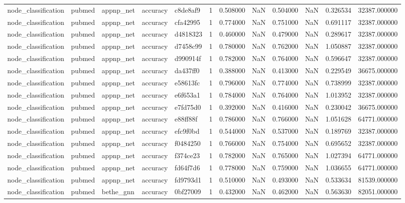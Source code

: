 \begin{tabular}{lllllrrrrrrr}
node_classification & pubmed & appnp_net & accuracy & c8de8af9 & 1 & 0.508000 & NaN & 0.504000 & NaN & 0.326534 & 32387.000000 \\
node_classification & pubmed & appnp_net & accuracy & cfa42995 & 1 & 0.774000 & NaN & 0.751000 & NaN & 0.691117 & 32387.000000 \\
node_classification & pubmed & appnp_net & accuracy & d4818323 & 1 & 0.460000 & NaN & 0.479000 & NaN & 0.289617 & 32387.000000 \\
node_classification & pubmed & appnp_net & accuracy & d7458c99 & 1 & 0.780000 & NaN & 0.762000 & NaN & 1.050887 & 32387.000000 \\
node_classification & pubmed & appnp_net & accuracy & d990914f & 1 & 0.782000 & NaN & 0.764000 & NaN & 0.596647 & 32387.000000 \\
node_classification & pubmed & appnp_net & accuracy & da437ff0 & 1 & 0.388000 & NaN & 0.413000 & NaN & 0.229549 & 36675.000000 \\
node_classification & pubmed & appnp_net & accuracy & e58613fc & 1 & 0.796000 & NaN & 0.774000 & NaN & 0.738999 & 32387.000000 \\
node_classification & pubmed & appnp_net & accuracy & e6f653a1 & 1 & 0.784000 & NaN & 0.764000 & NaN & 1.013952 & 32387.000000 \\
node_classification & pubmed & appnp_net & accuracy & e7fd75d0 & 1 & 0.392000 & NaN & 0.416000 & NaN & 0.230042 & 36675.000000 \\
node_classification & pubmed & appnp_net & accuracy & e88ff88f & 1 & 0.786000 & NaN & 0.766000 & NaN & 1.051628 & 64771.000000 \\
node_classification & pubmed & appnp_net & accuracy & efc9f0bd & 1 & 0.544000 & NaN & 0.537000 & NaN & 0.189769 & 32387.000000 \\
node_classification & pubmed & appnp_net & accuracy & f0484250 & 1 & 0.766000 & NaN & 0.754000 & NaN & 0.695652 & 32387.000000 \\
node_classification & pubmed & appnp_net & accuracy & f374ce23 & 1 & 0.782000 & NaN & 0.765000 & NaN & 1.027394 & 64771.000000 \\
node_classification & pubmed & appnp_net & accuracy & fd64f7d6 & 1 & 0.778000 & NaN & 0.759000 & NaN & 1.036655 & 64771.000000 \\
node_classification & pubmed & appnp_net & accuracy & fd9793d1 & 1 & 0.510000 & NaN & 0.493000 & NaN & 0.533634 & 81539.000000 \\
node_classification & pubmed & bethe_gnn & accuracy & 0bf27009 & 1 & 0.432000 & NaN & 0.462000 & NaN & 0.563630 & 82051.000000 \\

\end{tabular}
